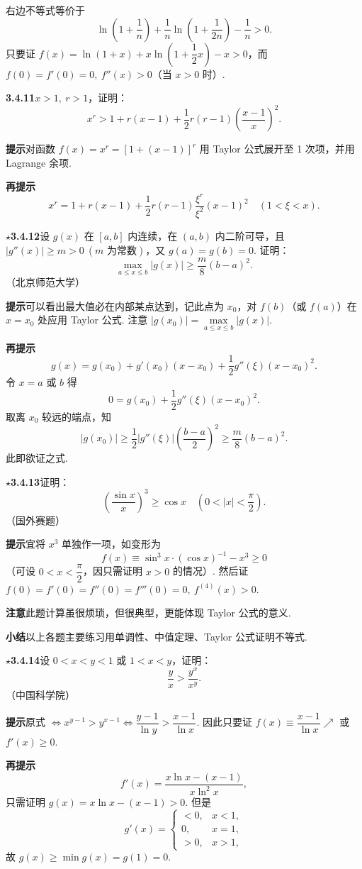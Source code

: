 \documentclass[UTF8,12pt,a4paper,fontset=fandol]{ctexart}
\begin{document}
右边不等式等价于
\[
  \ln\left(1+\frac1n\right)+\frac1n\ln\left(1+\frac1{2n}\right)-\frac1n>0.
\]
只要证 $f(x)=\ln(1+x)+x\ln\left(1+\dfrac12x\right)-x>0$，而 $f(0)=f'(0)=0,\ f''(x)>0$（当 $x>0$ 时）.

\noindent\textbf{3.4.11}\quad $x>1,\ r>1$，证明：
\[
  x^r>1+r(x-1)+\frac12r(r-1)\left(\frac{x-1}{x}\right)^2.
\]

\noindent\textbf{提示}\quad 对函数 $f(x)=x^r=[1+(x-1)]^r$ 用 Taylor 公式展开至 1 次项，并用 Lagrange 余项.

\noindent\textbf{再提示}\quad
\[
  x^r=1+r(x-1)+\frac12r(r-1)\frac{\xi^r}{\xi^2}(x-1)^2\quad(1<\xi<x).
\]

\noindent\textbf{$\star$3.4.12}\quad 设 $g(x)$ 在 $[a,b]$ 内连续，在 $(a,b)$ 内二阶可导，且 $|g''(x)|\ge m>0\ (m\text{ 为常数})$，又 $g(a)=g(b)=0$. 证明：
\[
  \max_{a\le x\le b}|g(x)|\ge\frac m8(b-a)^2.
\]
（北京师范大学）

\noindent\textbf{提示}\quad 可以看出最大值必在内部某点达到，记此点为 $x_0$，对 $f(b)$（或 $f(a)$）在 $x=x_0$ 处应用 Taylor 公式. 注意 $|g(x_0)|=\max\limits_{a\le x\le b}|g(x)|$.

\noindent\textbf{再提示}\quad
\[
  g(x)=g(x_0)+g'(x_0)(x-x_0)+\frac12g''(\xi)(x-x_0)^2.
\]
令 $x=a$ 或 $b$ 得
\[
  0=g(x_0)+\frac12g''(\xi)(x-x_0)^2.
\]
取离 $x_0$ 较远的端点，知
\[
  |g(x_0)|\ge\frac12|g''(\xi)|\left(\frac{b-a}2\right)^2
  \ge\frac m8(b-a)^2.
\]
此即欲证之式.

\noindent\textbf{$\star$3.4.13}\quad 证明：
\[
  \left(\frac{\sin x}{x}\right)^3\ge \cos x\quad\left(0<|x|<\frac\pi2\right).
\]
（国外赛题）

\noindent\textbf{提示}\quad 宜将 $x^3$ 单独作一项，如变形为
\[
  f(x)\equiv\sin^3x\cdot(\cos x)^{-1}-x^3\ge0
\]
（可设 $0<x<\dfrac\pi2$，因只需证明 $x>0$ 的情况）. 然后证 $f(0)=f'(0)=f''(0)=f'''(0)=0,\ f^{(4)}(x)>0$.

\noindent\textbf{注意}\quad 此题计算虽很烦琐，但很典型，更能体现 Taylor 公式的意义.

\noindent\textbf{小结}\quad 以上各题主要练习用单调性、中值定理、Taylor 公式证明不等式.

\noindent\textbf{$\star$3.4.14}\quad 设 $0<x<y<1$ 或 $1<x<y$，证明：
\[
  \frac yx>\frac{y^x}{x^y}.
\]
（中国科学院）

\noindent\textbf{提示}\quad 原式 $\Leftrightarrow x^{y-1}>y^{x-1}\Leftrightarrow\dfrac{y-1}{\ln y}>\dfrac{x-1}{\ln x}$. 因此只要证 $f(x)\equiv\dfrac{x-1}{\ln x}\nearrow$ 或 $f'(x)\ge0$.

\noindent\textbf{再提示}\quad
\[
  f'(x)=\frac{x\ln x-(x-1)}{x\ln^2x},
\]
只需证明 $g(x)=x\ln x-(x-1)>0$. 但是
\[
g'(x)=
\begin{cases}
<0, & x<1,\\
0, & x=1,\\
>0, & x>1,
\end{cases}
\]
故 $g(x)\ge \min g(x)=g(1)=0$.
\end{document}
